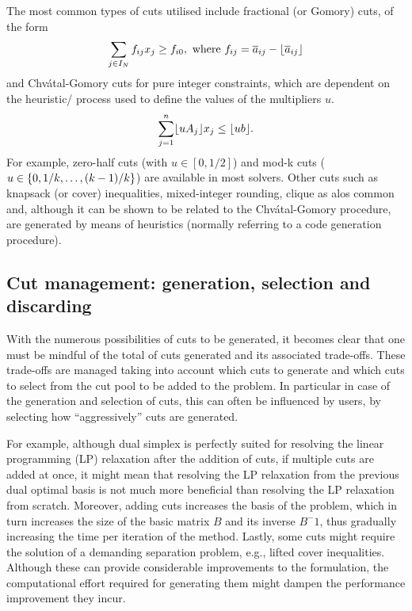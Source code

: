 The most common types of cuts utilised include fractional (or Gomory) cuts, of the form
%
\begin{equation*}
	\sum_{j \in I_N} f_{ij}x_j \geq f_{i0}, \text{ where } f_{ij} = \overline{a}_{ij} - \lfloor \overline{a}_{ij} \rfloor
\end{equation*}
%
and Chv\'atal-Gomory cuts for pure integer constraints, which are dependent on the heuristic/ process used to define the values of the multipliers $u$.
% 
\begin{equation*}
	\sum_{j=1}^n  \lfloor uA_j \rfloor x_j \leq \lfloor ub \rfloor.
\end{equation*} 
%
For example, zero-half cuts (with $u \in [0,1/2]$) and mod-k cuts ($u \in \left\{ 0, 1/k, \dots, (k-1)/k \right \}$) are available in most solvers. Other cuts such as knapsack (or cover) inequalities, mixed-integer rounding, clique as alos common and, although it can be shown to be related to the Chv\'atal-Gomory procedure, are generated by means of heuristics (normally referring to a code generation procedure).


\subsection{Cut management: generation, selection and discarding}

With the numerous possibilities of cuts to be generated, it becomes clear that one must be mindful of the total of cuts generated and its associated trade-offs. These trade-offs are managed taking into account which cuts to generate and which cuts to select from the cut pool to be added to the problem. In particular in case of the generation and selection of cuts, this can often be influenced by users, by selecting how ``aggressively'' cuts are generated.

For example, although dual simplex is perfectly suited for resolving the linear programming (LP) relaxation after the addition of cuts, if multiple cuts are added at once, it might mean that resolving the LP relaxation from the previous dual optimal basis is not much more beneficial than resolving the LP relaxation from scratch. Moreover, adding cuts increases the basis of the problem, which in turn increases the size of the basic matrix $B$ and its inverse $B^-1$, thus gradually increasing the time per iteration of the method. Lastly, some cuts might require the solution of a demanding separation problem, e.g., lifted cover inequalities. Although these can provide considerable improvements to the formulation, the computational effort required for generating them might dampen the performance improvement they incur.

